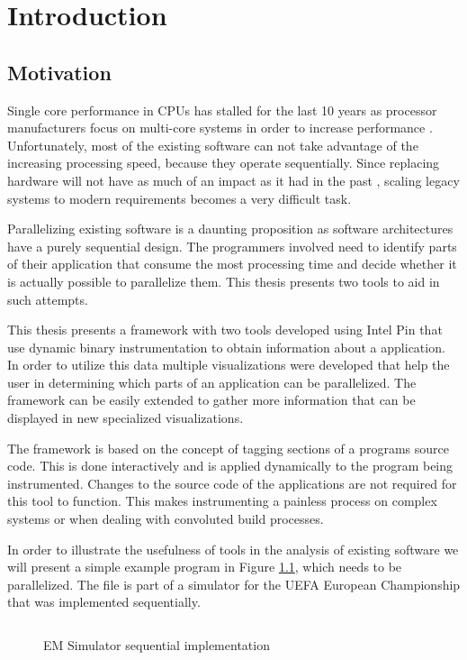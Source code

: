 \chapter{Introduction}

\section {Motivation}

Single core performance in CPUs has stalled for the last 10 years as processor manufacturers focus on multi-core systems in order to increase performance \cite{procspeed2}. Unfortunately, most of the existing software can not take advantage of the increasing processing speed, because they operate sequentially. Since replacing hardware will not have as much of an impact as it had in the past \cite{procspeed}, scaling legacy systems to modern requirements becomes a very difficult task.

Parallelizing existing software is a daunting proposition as software architectures have a purely sequential design. The programmers involved need to identify parts of their application that consume the most processing time and decide whether it is actually possible to parallelize them. This thesis presents two tools to aid in such attempts.

This thesis presents a framework with two tools developed using Intel Pin \cite{pin} that use dynamic binary instrumentation to obtain information about a application. In order to utilize this data multiple visualizations were developed that help the user in determining which parts of an application can be parallelized. The framework can be easily extended to gather more information that can be displayed in new specialized visualizations.

The framework is based on the concept of tagging sections of a programs source code. This is done interactively and is applied dynamically to the program being instrumented. Changes to the source code of the applications are not required for this tool to function. This makes instrumenting a painless process on complex systems or when dealing with convoluted build processes.

In order to illustrate the usefulness of tools in the analysis of existing software we will present a simple example program in Figure \ref{cap1:emsim:seq}, which needs to be parallelized. The file is part of a simulator for the UEFA European Championship that was implemented sequentially.

\begin{figure}
	\begin{center}
		\inputminted[linenos, fontsize=\scriptsize]{c}{emsim_seq.c}
	\end{center}
	\caption{EM Simulator sequential implementation}
	\label{cap1:emsim:seq}
\end{figure}

